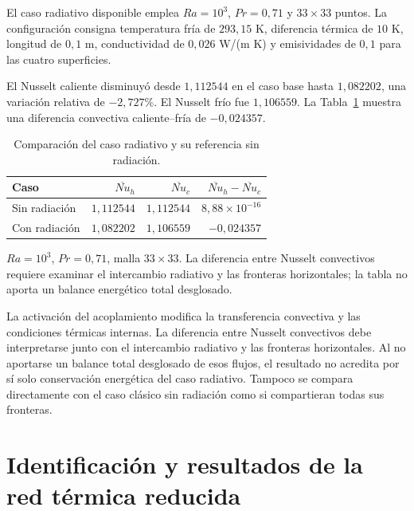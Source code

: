 El caso radiativo disponible emplea $Ra=10^3$, $Pr=0{,}71$ y $33\times33$ puntos. La configuración consigna temperatura fría de $293{,}15$ K, diferencia térmica de $10$ K, longitud de $0{,}1$ m, conductividad de $0{,}026$ W/(m K) y emisividades de $0{,}1$ para las cuatro superficies.

El Nusselt caliente disminuyó desde $1{,}112544$ en el caso base hasta $1{,}082202$, una variación relativa de $-2{,}727\%$. El Nusselt frío fue $1{,}106559$. La Tabla~\ref{tab:res_cavidad_radiacion} muestra una diferencia convectiva caliente--fría de $-0{,}024357$.

\begin{table}[htbp]
\centering
\caption{Comparación del caso radiativo y su referencia sin radiación.}
\label{tab:res_cavidad_radiacion}
\small
\setlength{\tabcolsep}{5pt}
\begin{tabular}{lrrr}
\toprule
Caso & $\overline{Nu}_h$ & $\overline{Nu}_c$ & $\overline{Nu}_h-\overline{Nu}_c$ \\
\midrule
Sin radiación & $1{,}112544$ & $1{,}112544$ & $8{,}88\times10^{-16}$ \\
Con radiación & $1{,}082202$ & $1{,}106559$ & $-0{,}024357$ \\
\bottomrule
\end{tabular}
\par\vspace{3pt}
\begin{minipage}{0.98\textwidth}\footnotesize
$Ra=10^3$, $Pr=0{,}71$, malla $33\times33$. La diferencia entre Nusselt convectivos requiere examinar el intercambio radiativo y las fronteras horizontales; la tabla no aporta un balance energético total desglosado.
\end{minipage}
\end{table}


La activación del acoplamiento modifica la transferencia convectiva y las condiciones térmicas internas. La diferencia entre Nusselt convectivos debe interpretarse junto con el intercambio radiativo y las fronteras horizontales. Al no aportarse un balance total desglosado de esos flujos, el resultado no acredita por sí solo conservación energética del caso radiativo. Tampoco se compara directamente con el caso clásico sin radiación como si compartieran todas sus fronteras.

\FloatBarrier

\section{Identificación y resultados de la red térmica reducida}
\label{res:red}

